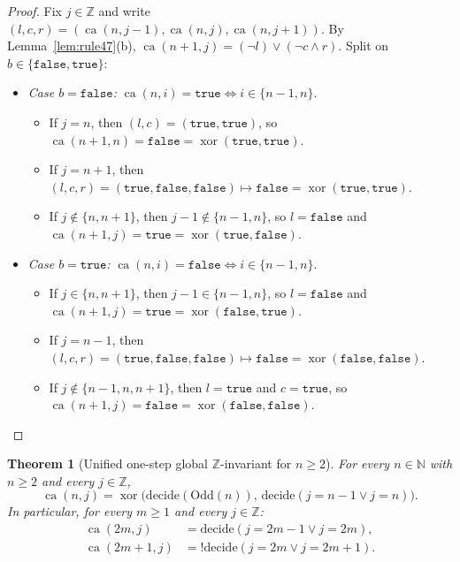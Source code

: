 \documentclass[11pt]{article}
\newtheorem{theorem}{Theorem}[section]
\theoremstyle{definition}
\newcommand{\N}{\mathbb{N}}
\newcommand{\Z}{\mathbb{Z}}
\newcommand{\ca}{\operatorname{ca}}
\begin{document}
\begin{proof}
Fix $j \in \Z$ and write $(l, c, r) = (\ca(n, j - 1), \ca(n, j), \ca(n, j + 1))$. By Lemma~\ref{lem:rule47}(b), $\ca(n + 1, j) = (\neg l) \lor (\neg c \land r)$. Split on $b \in \{\mathtt{false}, \mathtt{true}\}$:
\begin{itemize}
\item \emph{Case $b = \mathtt{false}$:} $\ca(n, i) = \mathtt{true} \iff i \in \{n - 1, n\}$.
  \begin{itemize}
  \item If $j = n$, then $(l, c) = (\mathtt{true}, \mathtt{true})$, so $\ca(n + 1, n) = \mathtt{false} = \operatorname{xor}(\mathtt{true}, \mathtt{true})$.
  \item If $j = n + 1$, then $(l, c, r) = (\mathtt{true}, \mathtt{false}, \mathtt{false}) \mapsto \mathtt{false} = \operatorname{xor}(\mathtt{true}, \mathtt{true})$.
  \item If $j \notin \{n, n + 1\}$, then $j - 1 \notin \{n - 1, n\}$, so $l = \mathtt{false}$ and $\ca(n + 1, j) = \mathtt{true} = \operatorname{xor}(\mathtt{true}, \mathtt{false})$.
  \end{itemize}
\item \emph{Case $b = \mathtt{true}$:} $\ca(n, i) = \mathtt{false} \iff i \in \{n - 1, n\}$.
  \begin{itemize}
  \item If $j \in \{n, n + 1\}$, then $j - 1 \in \{n - 1, n\}$, so $l = \mathtt{false}$ and $\ca(n + 1, j) = \mathtt{true} = \operatorname{xor}(\mathtt{false}, \mathtt{true})$.
  \item If $j = n - 1$, then $(l, c, r) = (\mathtt{true}, \mathtt{false}, \mathtt{false}) \mapsto \mathtt{false} = \operatorname{xor}(\mathtt{false}, \mathtt{false})$.
  \item If $j \notin \{n - 1, n, n + 1\}$, then $l = \mathtt{true}$ and $c = \mathtt{true}$, so $\ca(n + 1, j) = \mathtt{false} = \operatorname{xor}(\mathtt{false}, \mathtt{false})$. \qedhere
  \end{itemize}
\end{itemize}
\end{proof}

\begin{theorem}[Unified one-step global $\Z$-invariant for $n \ge 2$]
\label{thm:global-inv}
For every $n \in \N$ with $n \ge 2$ and every $j \in \Z$,
\begin{equation}
\label{eq:inv-xor}
\ca(n, j) = \operatorname{xor}\bigl(\mathrm{decide}(\mathrm{Odd}(n)),\, \mathrm{decide}(j = n - 1 \lor j = n)\bigr).
\end{equation}
In particular, for every $m \ge 1$ and every $j \in \Z$:
\begin{align}
\ca(2m, j) &= \mathrm{decide}(j = 2m - 1 \lor j = 2m), \label{eq:inv-even}\\
\ca(2m + 1, j) &= !\mathrm{decide}(j = 2m \lor j = 2m + 1). \label{eq:inv-odd}
\end{align}
\end{theorem}
\end{document}
